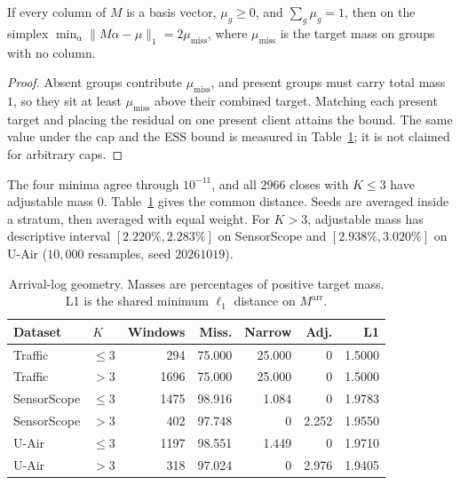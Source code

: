 \begin{proposition}
\label{prop:arrival_simplex}
If every column of $M$ is a basis vector, $\mu_g\ge 0$, and $\sum_g\mu_g=1$,
then on the simplex
$\min_{\alpha}\|M\alpha-\mu\|_1=2\mu_{\mathrm{miss}}$,
where $\mu_{\mathrm{miss}}$ is the target mass on groups with no column.
\end{proposition}

\begin{proof}
Absent groups contribute $\mu_{\mathrm{miss}}$, and present groups must carry
total mass $1$, so they sit at least $\mu_{\mathrm{miss}}$ above their combined
target. Matching each present target and placing the residual on one present
client attains the bound. The same value under the cap and the ESS bound is
measured in Table~\ref{tab:arrival_support}; it is not claimed for arbitrary caps.
\end{proof}

The four minima agree through $10^{-11}$, and all $2966$ closes with
$K\le 3$ have adjustable mass $0$. Table~\ref{tab:arrival_support} gives the
common distance. Seeds are averaged inside a stratum, then averaged with
equal weight. For $K>3$, adjustable mass has descriptive interval
$[2.220\%,2.283\%]$ on SensorScope and $[2.938\%,3.020\%]$ on U-Air
($10{,}000$ resamples, seed $20261019$).

\begin{table}[!htbp]
\centering
\caption{Arrival-log geometry. Masses are percentages of positive target
mass. L1 is the shared minimum $\ell_1$ distance on $M^{\mathrm{arr}}$.}
\label{tab:arrival_support}
\footnotesize
\setlength{\tabcolsep}{2.5pt}
\begin{tabular}{llrrrrr}
\toprule
Dataset & $K$ & Windows & Miss. & Narrow & Adj. & L1\\
\midrule
Traffic & $\le 3$ & 294 & 75.000 & 25.000 & 0 & 1.5000\\
Traffic & $>3$ & 1696 & 75.000 & 25.000 & 0 & 1.5000\\
SensorScope & $\le 3$ & 1475 & 98.916 & 1.084 & 0 & 1.9783\\
SensorScope & $>3$ & 402 & 97.748 & 0 & 2.252 & 1.9550\\
U-Air & $\le 3$ & 1197 & 98.551 & 1.449 & 0 & 1.9710\\
U-Air & $>3$ & 318 & 97.024 & 0 & 2.976 & 1.9405\\
\bottomrule
\end{tabular}
\end{table}

